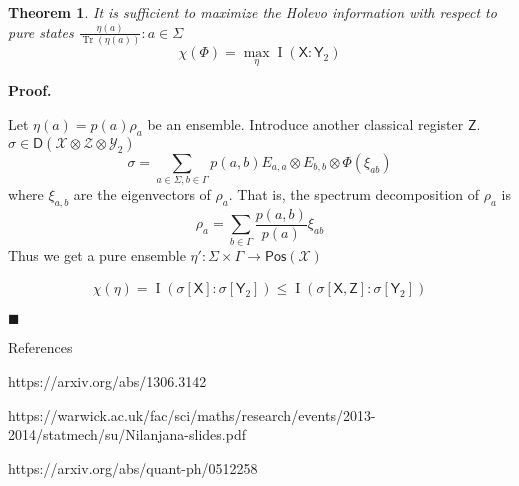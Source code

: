 \documentclass[aps,pra,onecolumn,notitlepage,superscriptaddress]{revtex4-1}
\newcommand{\reg}[1]{\mathsf{#1}}
\newcommand{\spc}[1]{\mathcal{#1}}
\newcommand{\Pos}{\mathsf{Pos}}
\newcommand{\D}{\mathsf{D}}
\newcommand{\Tr}{\operatorname{Tr}}
\newcommand{\op}[1]{\operatorname{#1}}
\newtheorem{theo}{Theorem}
\def\Proof{{\bf Proof.~}}
\def\qed{$\blacksquare$ \newline}
\begin{document}
    \begin{theo}
        It is sufficient to maximize the Holevo information with respect to pure states $\frac{\eta(a)}{\Tr (\eta(a))} : a \in \Sigma$
        \begin{equation}
            \chi(\Phi) = \max_\eta \op I(\reg X : \reg Y_2)
        \end{equation}
    \end{theo}
    \Proof {
        Let $\eta(a) = p(a)\rho_a$ be an ensemble. Introduce another classical register $\reg Z$. $\sigma \in \D( \spc X \otimes \spc Z \otimes \spc Y_2 )$
        \begin{equation}
            \sigma = \sum_{a \in \Sigma, b \in \Gamma} p(a, b) E_{a,a} \otimes E_{b,b} \otimes \Phi(\xi_{ab})
        \end{equation}
        where $\xi_{a,b}$ are the eigenvectors of $\rho_a$. That is, the spectrum decomposition of $\rho_a$ is 
        \begin{equation}
            \rho_a = \sum_{b \in \Gamma} \frac{p(a,b)}{p(a)} \xi_{ab}
        \end{equation}
        Thus we get a pure ensemble $\eta' : \Sigma \times \Gamma \to \Pos(\spc X)$

        \begin{align*}
            \chi(\eta) = \op I(\sigma[\reg X] : \sigma[\reg Y_2]) \leq \op I(\sigma[\reg X, \reg Z] : \sigma[\reg Y_2])
        \end{align*}
    }\qed

    References

    https://arxiv.org/abs/1306.3142

    https://warwick.ac.uk/fac/sci/maths/research/events/2013-2014/statmech/su/Nilanjana-slides.pdf
    
    https://arxiv.org/abs/quant-ph/0512258
\end{document}
